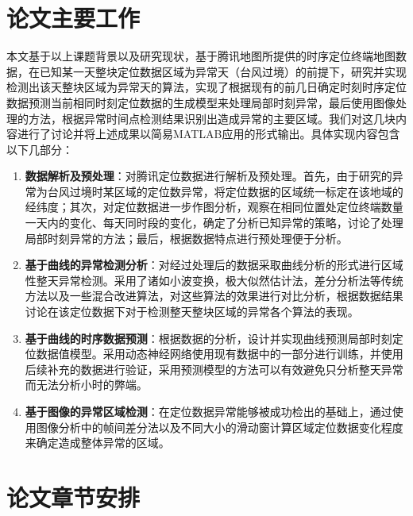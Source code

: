 \documentclass[a4paper,AutoFakeBold,oneside,12pt]{book}
\begin{document}
\section{论文主要工作}

本文基于以上课题背景以及研究现状，基于腾讯地图所提供的时序定位终端地图数据，在已知某一天整块定位数据区域为异常天（台风过境）的前提下，研究并实现检测出该天整块区域为异常天的算法，实现了根据现有的前几日确定时刻时序定位数据预测当前相同时刻定位数据的生成模型来处理局部时刻异常，最后使用图像处理的方法，根据异常时间点检测结果识别出造成异常的主要区域。我们对这几块内容进行了讨论并将上述成果以简易MATLAB应用的形式输出。具体实现内容包含以下几部分：
\begin{enumerate}
\item \textbf{数据解析及预处理}：对腾讯定位数据进行解析及预处理。首先，由于研究的异常为台风过境时某区域的定位数异常，将定位数据的区域统一标定在该地域的经纬度；其次，对定位数据进一步作图分析，观察在相同位置处定位终端数量一天内的变化、每天同时段的变化，确定了分析已知异常的策略，讨论了处理局部时刻异常的方法；最后，根据数据特点进行预处理便于分析。
\item \textbf{基于曲线的异常检测分析}：对经过处理后的数据采取曲线分析的形式进行区域性整天异常检测。采用了诸如小波变换，极大似然估计法，差分分析法等传统方法以及一些混合改进算法，对这些算法的效果进行对比分析，根据数据结果讨论在该定位数据下对于检测整天整块区域的异常各个算法的表现。
\item \textbf{基于曲线的时序数据预测}：根据数据的分析，设计并实现曲线预测局部时刻定位数据值模型。采用动态神经网络使用现有数据中的一部分进行训练，并使用后续补充的数据进行验证，采用预测模型的方法可以有效避免只分析整天异常而无法分析小时的弊端。
\item \textbf{基于图像的异常区域检测}：在定位数据异常能够被成功检出的基础上，通过使用图像分析中的帧间差分法以及不同大小的滑动窗计算区域定位数据变化程度来确定造成整体异常的区域。
\end{enumerate}

\section{论文章节安排}
\end{document}
